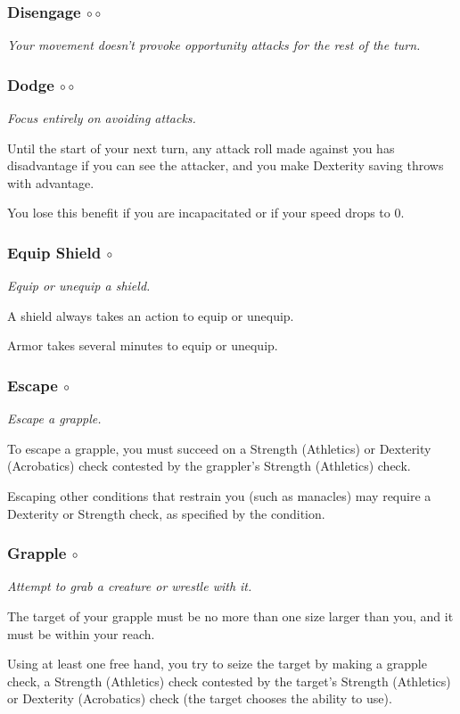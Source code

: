 \subsubsection{Disengage $\circ\circ$}
    \textit{Your movement doesn't provoke opportunity attacks for the rest of the turn.}
\subsubsection{Dodge $\circ\circ$}
    \textit{Focus entirely on avoiding attacks.}

    Until the start of your next turn, any attack roll made against you has disadvantage if you can see the attacker, and you make Dexterity saving throws with advantage.

    You lose this benefit if you are incapacitated or if your speed drops to 0.
\subsubsection{Equip Shield $\circ$}
    \textit{Equip or unequip a shield.}

    A shield always takes an action to equip or unequip.

    Armor takes several minutes to equip or unequip.
\subsubsection{Escape $\circ$}
    \textit{Escape a grapple.}

    To escape a grapple, you must succeed on a Strength (Athletics) or Dexterity (Acrobatics) check contested by the grappler's Strength (Athletics) check.

    Escaping other conditions that restrain you (such as manacles) may require a Dexterity or Strength check, as specified by the condition.
\subsubsection{Grapple $\circ$}
    \textit{Attempt to grab a creature or wrestle with it.}

    The target of your grapple must be no more than one size larger than you, and it must be within your reach.

    Using at least one free hand, you try to seize the target by making a grapple check, a Strength (Athletics) check contested by the target's Strength (Athletics) or Dexterity (Acrobatics) check (the target chooses the ability to use).

